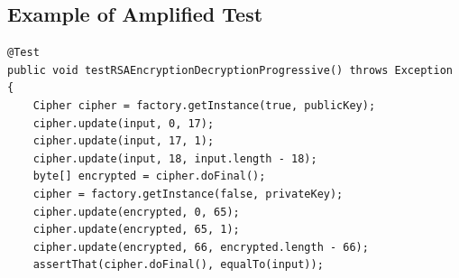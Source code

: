 \documentclass[a4paper,11pt]{sdm_internship}
\theoremstyle{definition}
\begin{document}
\begin{appendices}

\section{Example of Amplified Test}%
\label{app:res_dspot}
\begin{listing}[H]
  \centering
  \begin{verbatim}
@Test
public void testRSAEncryptionDecryptionProgressive() throws Exception
{
    Cipher cipher = factory.getInstance(true, publicKey);
    cipher.update(input, 0, 17);
    cipher.update(input, 17, 1);
    cipher.update(input, 18, input.length - 18);
    byte[] encrypted = cipher.doFinal();
    cipher = factory.getInstance(false, privateKey);
    cipher.update(encrypted, 0, 65);
    cipher.update(encrypted, 65, 1);
    cipher.update(encrypted, 66, encrypted.length - 66);
    assertThat(cipher.doFinal(), equalTo(input));


\end{verbatim}
\end{listing}
\end{appendices}
\end{document}
